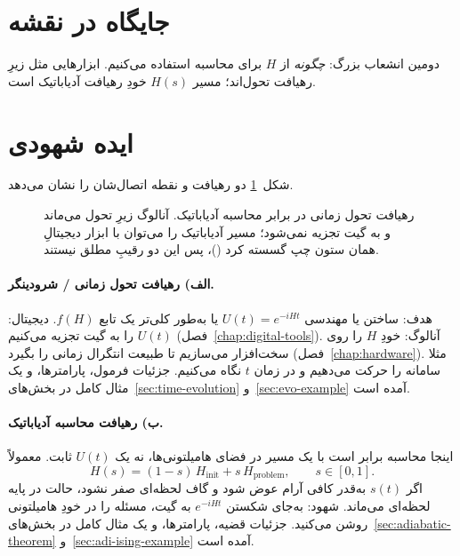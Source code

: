 \section{جایگاه در نقشه}

دومین انشعاب بزرگ: \emph{چگونه} از $H$ برای محاسبه استفاده می‌کنیم. ابزارهایی مثل  زیرِ رهیافت تحول‌اند؛ مسیر $H(s)$ خودِ رهیافت آدیاباتیک است.

\section{ایده شهودی}

شکل~\ref{fig:two-paradigms} دو رهیافت و نقطه اتصال‌شان را نشان می‌دهد.

\begin{figure}[htbp]
	\centering
	\begin{latin}
		\resizebox{\ifdim\width>\textwidth\textwidth\else\width\fi}{!}{%
		}
	\end{latin}
	\caption{رهیافت تحول زمانی در برابر محاسبه آدیاباتیک. آنالوگ زیرِ تحول می‌ماند و به گیت تجزیه نمی‌شود؛ مسیر آدیاباتیک را می‌توان با ابزار دیجیتالِ همان ستون چپ گسسته کرد ()، پس این دو رقیبِ مطلق نیستند.}
	\label{fig:two-paradigms}
\end{figure}

\paragraph{الف) رهیافت تحول زمانی / شرودینگر.}
هدف: ساختن یا مهندسی $U(t)=e^{-iHt}$ یا به‌طور کلی‌تر یک تابع $f(H)$. دیجیتال: $U(t)$ را به گیت تجزیه می‌کنیم (فصل~\ref{chap:digital-tools}). آنالوگ: خودِ $H$ را روی سخت‌افزار می‌سازیم تا طبیعت انتگرال زمانی را بگیرد (فصل~\ref{chap:hardware}). مثلا سامانه را حرکت می‌دهیم و در زمان $t$ نگاه می‌کنیم. جزئیات فرمول، پارامترها، و یک مثال کامل در بخش‌های~\ref{sec:time-evolution} و~\ref{sec:evo-example} آمده است.

\paragraph{ب) رهیافت محاسبه آدیاباتیک.}
اینجا محاسبه برابر است با یک مسیر در فضای هامیلتونی‌ها، نه یک $U(t)$ ثابت. معمولاً
\begin{equation}
	H(s) = (1-s)\,H_{\mathrm{init}} + s\,H_{\mathrm{problem}},\qquad s\in[0,1].
\end{equation}
اگر $s(t)$ به‌قدر کافی آرام عوض شود و گاف لحظه‌ای صفر نشود، حالت در پایه لحظه‌ای می‌ماند. شهود: به‌جای شکستن $e^{-iHt}$ به گیت، مسئله را در خودِ هامیلتونی روشن می‌کنید. جزئیات قضیه، پارامترها، و یک مثال کامل  در بخش‌های~\ref{sec:adiabatic-theorem} و~\ref{sec:adi-ising-example} آمده است.

